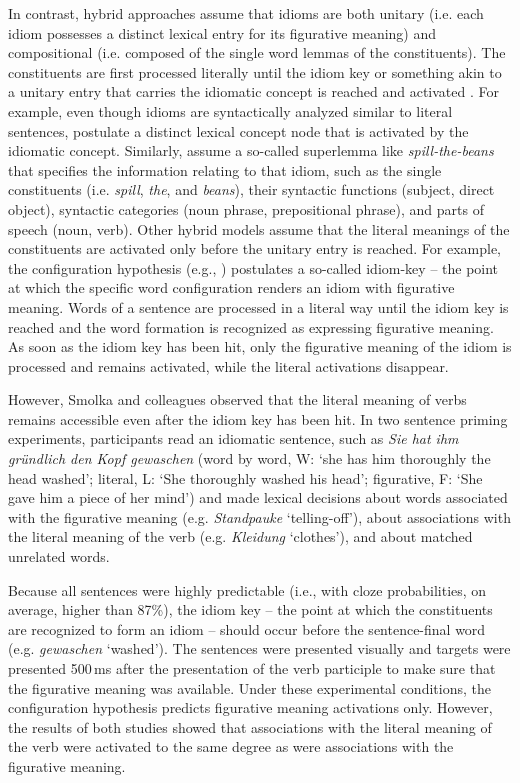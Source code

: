 \documentclass[output=paper]{langsci/langscibook}
\begin{document}
In contrast, hybrid approaches assume that idioms are both unitary (i.e. each idiom possesses a distinct lexical entry for its figurative meaning) and compositional (i.e. composed of the single word lemmas of the constituents). The constituents are first processed literally until the idiom key or something akin to a unitary entry that carries the idiomatic concept is reached and activated \citep{cacciari:1988,caillies:2007,connine:1992,cutting:1997,gibbs:1989,holsinger:2013,sprenger:2006,titone:1999}. For example, even though idioms are syntactically analyzed similar to literal sentences, \citet{cutting:1997} postulate a distinct lexical concept node that is activated by the idiomatic concept. Similarly, \citet{sprenger:2006} assume a so-called superlemma like \textit{spill-the-beans} that specifies the information relating to that idiom, such as the single constituents (i.e. \textit{spill}, \textit{the}, and \textit{beans}), their syntactic functions (subject, direct object), syntactic categories (noun phrase, prepositional phrase), and parts of speech (noun, verb). Other hybrid models assume that the literal meanings of the constituents are activated only before the unitary entry is reached. For example, the configuration hypothesis (e.g., \citealt{cacciari:1988}) postulates a so-called idiom-key – the point at which the specific word configuration renders an idiom with figurative meaning. Words of a sentence are processed in a literal way until the idiom key is reached and the word formation is recognized as expressing figurative meaning. As soon as the idiom key has been hit, only the figurative meaning of the idiom is processed and remains activated, while the literal activations disappear.\largerpage

However, Smolka and colleagues \citep{rabanus:2008,smolka:2007} observed that the literal meaning of verbs remains accessible even after the idiom key has been hit. In two sentence priming experiments, participants read an idiomatic sentence, such as \textit{Sie hat ihm gründlich den Kopf gewaschen} (word by word, W: ‘she has him thoroughly the head washed’; literal, L: ‘She thoroughly washed his head’; figurative, F: `She gave him a piece of her mind') and made lexical decisions about words associated with the figurative meaning (e.g. \textit{Standpauke} ‘telling-off’), about associations with the literal meaning of the verb (e.g. \textit{Kleidung} ‘clothes’), and about matched unrelated words. 

Because all sentences were highly predictable (i.e., with cloze probabilities, on average, higher than 87\%), the idiom key -- the point at which the constituents are recognized to form an idiom -- should occur before the sentence-final word (e.g. \textit{gewaschen} ‘washed’). The sentences were presented visually and targets were presented 500\,ms after the presentation of the verb participle to make sure that the figurative meaning was available. Under these experimental conditions, the configuration hypothesis \citep{cacciari:1988} predicts figurative meaning activations only. However, the results of both studies showed that associations with the literal meaning of the verb were activated to the same degree as were associations with the figurative meaning.  
\end{document}
